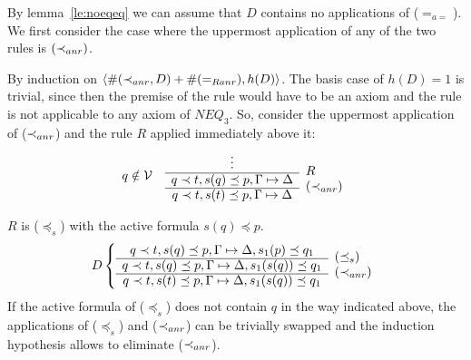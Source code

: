 \begin{PROOF}
By lemma~\ref{le:noeqeq} we can assume that $D$ contains no applications of
($=_{a=}$). We first consider the case where the uppermost application of any of the
two rules is $(\mathbin{\prec}_{anr})$.

By induction on $\langle\#(\mathbin{\prec}_{anr},D)+\#(=_{Ranr}),h(D)\rangle$.
The basis
case of $h(D)=1$ is trivial, since then the premise of the rule
would have to be an axiom and the rule is not applicable to any axiom of $NEQ_3$.
So, consider the uppermost application of ($\mathbin{\prec}_{anr}$) and the rule $R$ applied
immediately above it:
\[ q\notin \cal V\ \ \ \begin{array}{cl}
  \vdots & \raisebox{-1.2ex}[1.5ex][0ex]{$R$} \\ \cline{1-1}
  q\prec t,s(q)\preceq p,\Gamma\Seq\Delta &
  \raisebox{-1.2ex}[1.5ex][0ex]{($\prec_{anr}$)} \\ \cline{1-1}
  q\prec t,s(t)\preceq p,\Gamma\Seq\Delta &
\end{array} \]
%
\begin{LS}
\item $R$ is ($\preceq_s$) with the active formula $s(q)\preceq p$. 
  \[D \left\{ \begin{array}{cl}
 q\prec t,s(q)\preceq p,\Gamma \Seq \Delta,s_1(p)\preceq q_1  &
  \raisebox{-1.2ex}[1.5ex][0ex]{$(\preceq_s)$} \\ \cline{1-1}
 q\prec t,s(q)\preceq p,\Gamma \Seq \Delta, s_1(s(q))\preceq q_1  &
\raisebox{-1.2ex}[1.5ex][0ex]{$(\prec_{anr})$} \\ \cline{1-1}
 q\prec t,s(t)\preceq p,\Gamma \Seq\Delta, s_1(s(q))\preceq q_1
\end{array} \right. \]
If the active formula of ($\preceq_s$) does not contain $q$ in the way 
indicated above, the applications of ($\preceq_s$) and ($\mathbin{\prec}_{anr}$) can be
trivially swapped and the induction hypothesis allows to eliminate 
($\mathbin{\prec}_{anr}$). 


\end{LS}
\end{PROOF}

